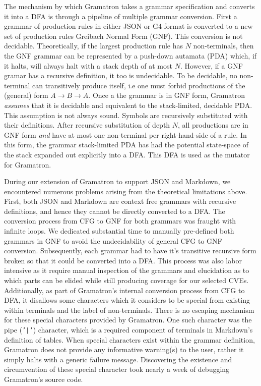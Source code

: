 \documentclass[12pt]{diazessay}
\begin{document}
The mechanism by which Gramatron takes a grammar specification and converts it into a DFA is through a pipeline of multiple grammar conversion.
First a grammar of production rules in either JSON or G4 format is converted to a new set of production rules Greibach Normal Form (GNF).
This conversion is not decidable.
Theoretically, if the largest production rule has $N$ non-terminals, then the GNF grammar can be represented by a push-down autamata (PDA) which, if it halts, will always halt with a stack depth of at most $N$.
However, if a GNF gramar has a recursive definition, it too is undecidable.
To be decidable, no non-terminal can transitively produce itself, i.e one must forbid productions of the (general) form $A \to B \to A$.
Once a the grammar is in GNF form, Gramatron \emph{assumes} that it is decidable and equivalent to the stack-limited, decidable PDA.
This assumption is not always sound.
Symbols are recursively substituted with their definitions.
After recursive substitution of depth $N$, all productions are in GNF form \emph{and} have at most one non-terminal per right-hand-side of a rule.
In this form, the grammar stack-limited PDA has had the potential state-space of the stack expanded out explicitly into a DFA.
This DFA is used as the mutator for Gramatron.

During our extension of Gramatron to support JSON and Markdown, we encountered numerous problems arising from the theoretical limitations above.
First, both JSON and Markdown are context free grammars with recursive definitions, and hence they cannot be directly converted to a DFA.
The conversion process from CFG to GNF for both grammars was fraught with infinite loops.
We dedicated substantial time to manually pre-defined both grammars in GNF to avoid the undecidability of general CFG to GNF conversion.
Subsequently, each grammar had to have it's transitive recursive form broken so that it could be converted into a DFA.
This process was also labor intensive as it require manual inspection of the grammars and elucidation as to which parts can be elided while still producing coverage for our selected CVEs.
Additionally, as part of Gramatron's internal conversion process from CFG to DFA, it disallows some characters which it considers to be special from existing within terminals and the label of non-terminals.
There is no escaping mechanism for these special characters provided by Gramatron.
One such character was the pipe (\texttt{'|'}) character, which is a required component of terminals in Markdown's definition of tables.
When special characters exist within the grammar definition, Gramatron does not provide any informative warning(s) to the user, rather it simply halts with a generic failure message.
Discovering the existence and circumvention of these special character took nearly a week of debugging Gramatron's source code.
\end{document}
